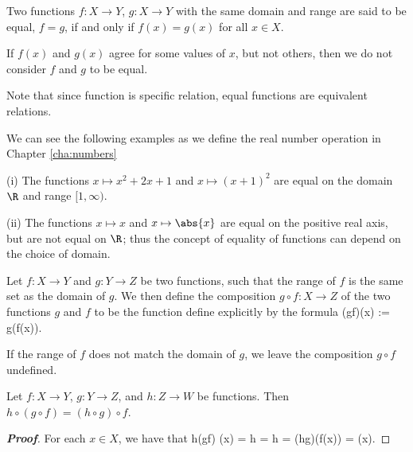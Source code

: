 \begin{definition}\label{def:equality_function}
Two functions $f:X\to Y$, $g:X\to Y$ with the same domain and range are said to be equal, $f=g$, if and only if $f(x) = g(x)$ for all $x\in X$.
\end{definition}

\begin{remark}
If $f(x)$ and $g(x)$ agree for some values of $x$, but not others, then we do not consider $f$ and $g$ to be equal.

Note that since function is specific relation, equal functions are equivalent relations.
\end{remark}

\begin{example}
We can see the following examples as we define the real number operation in Chapter \ref{cha:numbers}
\ben
\item [(i)] The functions $x\mapsto x^2 + 2x +1$ and $x\mapsto (x+1)^2$ are equal on the domain $\R$ and range $[1,\infty)$.
\item [(ii)] The functions $x\mapsto x$ and $x\mapsto \abs{x}$ are equal on the positive real axis, but are not equal on $\R$; thus the concept of equality of functions can depend on the choice of domain.
\een
\end{example}

\begin{definition}\label{def:composition_function}%
Let $f:X\to Y$ and $g:Y\to Z$ be two functions, such that the range of $f$ is the same set as the domain of $g$. We then define the composition $g\circ f:X\to Z$ of the two functions $g$ and $f$ to be the function define explicitly by the formula
\be
(g\circ f)(x) := g(f(x)).
\ee

If the range of $f$ does not match the domain of $g$, we leave the composition $g\circ f$ undefined.
\end{definition}

\begin{lemma}\label{lem:function_composition_is_associative}%
Let $f:X\to Y$, $g:Y\to Z$, and $h:Z\to W$ be functions. Then $h\circ (g\circ f) = (h\circ g)\circ f$.
\end{lemma}

\begin{proof}[\bf Proof]
For each $x\in X$, we have that
\be
h\circ (g\circ f) (x) = h = h = (h\circ g)(f(x)) = (x).
\ee
\end{proof}



